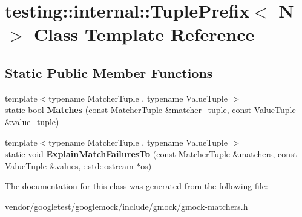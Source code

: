 \hypertarget{classtesting_1_1internal_1_1_tuple_prefix}{}\section{testing\+:\+:internal\+:\+:Tuple\+Prefix$<$ N $>$ Class Template Reference}
\label{classtesting_1_1internal_1_1_tuple_prefix}
\subsection*{Static Public Member Functions}
\begin{DoxyCompactItemize}
\item 
\mbox{\label{classtesting_1_1internal_1_1_tuple_prefix_ada24ceee73c02e3bb7f8264143170f7a}} 
{\footnotesize template$<$typename Matcher\+Tuple , typename Value\+Tuple $>$ }\\static bool {\bfseries Matches} (const \mbox{\hyperlink{structtesting_1_1internal_1_1_matcher_tuple}{Matcher\+Tuple}} \&matcher\+\_\+tuple, const Value\+Tuple \&value\+\_\+tuple)
\item 
\mbox{\label{classtesting_1_1internal_1_1_tuple_prefix_a0ffd38ce90ae6da645a5655aefac5bb7}} 
{\footnotesize template$<$typename Matcher\+Tuple , typename Value\+Tuple $>$ }\\static void {\bfseries Explain\+Match\+Failures\+To} (const \mbox{\hyperlink{structtesting_1_1internal_1_1_matcher_tuple}{Matcher\+Tuple}} \&matchers, const Value\+Tuple \&values, \+::std\+::ostream $\ast$os)
\end{DoxyCompactItemize}


The documentation for this class was generated from the following file\+:\begin{DoxyCompactItemize}
\item 
vendor/googletest/googlemock/include/gmock/gmock-\/matchers.\+h\end{DoxyCompactItemize}
